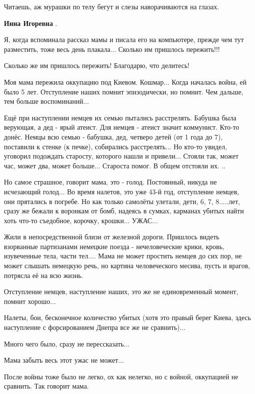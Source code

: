 \begin{itemize}
Читаешь, аж мурашки по телу бегут и слезы наворачиваются на глазах.

\textbf{Инна Игоревна} . 

Я, когда вспоминала рассказ мамы и писала его на компьютере, прежде чем тут
разместить, тоже весь день плакала... Сколько им пришлось пережить!!!

Сколько же им пришлось пережить! Благодарю, что делитесь!


Моя мама пережила оккупацию под Киевом. Кошмар... Когда началась война, ей было
5 лет. Отступление наших помнит эпизодически, но помнит. Чем дальше, тем больше
воспоминаний...

Ещё при наступлении немцев их семью пытались расстрелять. Бабушка была
верующая, а дед - ярый атеист. Для немцев - атеист значит коммунист. Кто-то
донёс. Немцы всю семью - бабушка, дед, четверо детей (от 1 года до 7),
поставили к стенке (к печке), собирались расстрелять... Но кто-то увидел,
уговорил подождать старосту, которого нашли и привели... Стояли так, может час,
может два, может больше... Староста помог. В общем отстояли их. ..

Но самое страшное, говорит мама, это - голод. Постоянный, никуда не исчезающий
голод... Во время налетов, это уже 43-й год, отступление немцев, они прятались
в погребе. Но как только самолёты улетали, дети, 6, 7, 8.....лет, сразу же
бежали к воронкам от бомб, надеясь в сумках, карманах убитых найти хоть что-то
съедобное, корочку, крошки... УЖАС...

Жили в непосредственной близи от железной дороги. Пришлось видеть взорванные
партизанами немецкие поезда - нечеловеческие крики, кровь, изувеченные тела,
части тел.... Мама не может простить немцев до сих пор, не может слышать
немецкую речь, но картина человеческого месива, пусть и врагов, потрясла её на
всю жизнь.

Отступление немцев, наступление наших, это же не единовременный момент, помнит
хорошо...

Налеты, бои, бесконечное количество убитых (хотя это правый берег Киева, здесь
наступление с форсированием Днепра все же не сравнить)...

Много чего было, сразу не перессказать...

Мама забыть весь этот ужас не может...

После войны тоже было не легко, ох как нелегко, но с войной, оккупацией не
сравнить. Так говорит мама.


\end{itemize}
